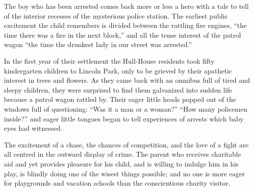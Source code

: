 \documentclass[]{article}
\begin{document}
\begin{sectionbody}
\addamsparagraph The boy who has been arrested comes back more or less a hero with a tale
to tell of the interior recesses of the mysterious police station. The
earliest public excitement the child remembers is divided between the
rattling fire engines, ``the time there was a fire in the next block,''
and all the tense interest of the patrol wagon ``the time the drunkest
lady in our street was arrested.''

\addamsparagraph In the first year of their settlement the Hull-House residents took
fifty kindergarten children to Lincoln Park, only to be grieved by their
apathetic interest in trees and flowers. As they came back with an
omnibus full of tired and sleepy children, they were surprised to find
them galvanized into sudden life because a patrol wagon rattled by.
Their eager little heads popped out of the windows full of questioning:
``Was it a man or a woman?'' ``How many policemen inside?'' and eager little
tongues began to tell experiences of arrests which baby eyes had
witnessed.

\addamsparagraph The excitement of a chase, the chances of competition, and the love of a
fight are all centred in the outward display of crime. The parent who
receives charitable aid and yet provides pleasure for his child, and is
willing to indulge him in his play, is blindly doing one of the wisest
things possible; and no one is more eager for playgrounds and vacation
schools than the conscientious charity visitor.


\end{sectionbody}
\end{document}
